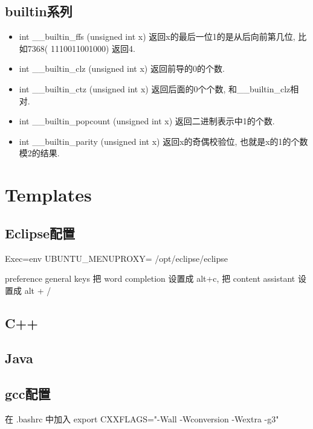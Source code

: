 \documentclass[landscape, twocolumn, 8pt, a4paper, twoside]{extarticle}
\begin{document}
\subsection{builtin系列}
\begin{itemize}
\item int \_\_builtin\_ffs (unsigned int x) 返回x的最后一位1的是从后向前第几位,  比如7368( 1110011001000) 返回4. 
\item int \_\_builtin\_clz (unsigned int x) 返回前导的0的个数. 
\item int \_\_builtin\_ctz (unsigned int x) 返回后面的0个个数, 和\_\_builtin\_clz相对. 
\item int \_\_builtin\_popcount (unsigned int x) 返回二进制表示中1的个数. 
\item int \_\_builtin\_parity (unsigned int x) 返回x的奇偶校验位, 也就是x的1的个数模2的结果. 
\end{itemize}

\section{Templates}

\subsection{Eclipse配置}
Exec=env UBUNTU\_MENUPROXY= /opt/eclipse/eclipse

preference general keys 把 word completion 设置成 alt+c, 把 content assistant 设置成 alt + /

\subsection{C++}


\subsection{Java}


\subsection{gcc配置}
在 .bashrc 中加入 export CXXFLAGS="-Wall -Wconversion -Wextra -g3"
 
\end{document}
